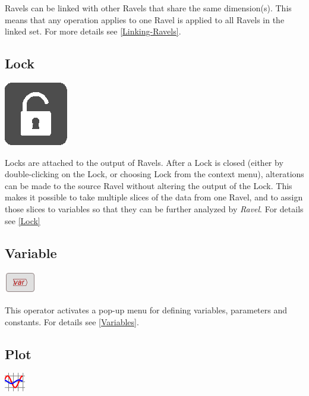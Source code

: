 Ravels can be linked with other Ravels that share the same dimension(s).
This means that any operation applies to one Ravel is applied to all
Ravels in the linked set. For more details see \ref{Linking-Ravels}.

\subsection{Lock}

\begin{center}
  \includegraphics{images/Lock}
\end{center}

Locks are attached to the output of Ravels. After a Lock is closed
(either by double-clicking on the Lock, or choosing Lock from the
context menu), alterations can be made to the source Ravel without
altering the output of the Lock. This makes it possible to take multiple
slices of the data from one Ravel, and to assign those slices to variables
so that they can be further analyzed by \emph{Ravel}. For details
see \ref{Lock}

\subsection{Variable}

\begin{center}
  \includegraphics{images/var}
\end{center}
    
This operator activates a pop-up menu for defining variables, parameters
and constants. For details see \ref{Variables}.

\subsection{Plot}
\begin{center}
  \includegraphics{images/plot}
\end{center}

